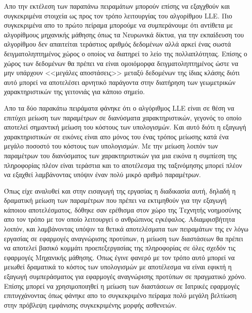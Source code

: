 \par
Απο την εκτέλεση των παραπάνω πειραμάτων μπορούν επίσης να εξαγχθούν και συγκεκριμένα στοιχεία ως προς τον τρόπο λειτουργίας του αλγορίθμου \textlatin{LLE}. Πιο συγκεκριμένα απο το πρώτο πείραμα μπορούμε να συμπεράνουμε ότι αντίθετα με αλγορίθμους μηχανικής μάθησης όπως τα Νευρωνικά δίκτυα, για την εκπαίδευση του αλγορίθμου δεν απαιτείται τεράστιος αριθμός δεδομένων αλλά αρκεί ένας σωστά δειγματοληπτημένος χώρος ο οποίος να διατηρεί το λείο της πολλαπλότητας. Επίσης ο χώρος των δεδομένων θα πρέπει να είναι ομοιόμορφα δειγματοληπτημένος ώστε να μην υπάρχουν <<μεγάλες αποστάσεις>> μεταξύ δεδομένων της ίδιας κλάσης διότι αυτό μπορεί να αποτελέσει αρνητικό παράγοντα στην διατήρηση των γεωμετρικών χαρακτηριστικών της γειτονιάς για κάποιο σημείο.
\par
Απο τα δύο παρακάτω πειράματα φάνηκε ότι ο αλγόριθμος \textlatin{LLE} είναι σε θέση να επιτύχει μείωση των παραμέτρων σε διανύσματα χαρακτηριστικών, γεγονός το οποίο αποτελεί σημαντική μείωση του κόστους των υπολογισμών. Και αυτό διότι η εξαγωγή χαρακτηριστικών σε εικόνες είναι απο μόνος του ένας τρόπος μείωσης κατά ένα μεγάλο ποσοστό του κόστους των υπολογισμών. Με την μείωση λοιπόν των παραμέτρων του διανύσματος των χαρακτηριστικών για μια εικόνα η συμπίεση της πληροφορίας πλέον είναι τεράστια και το αποτέλεσμα της ταξινόμησης μπορεί πλέον να εξαχθεί λαμβάνοντας υπόψιν έναν πολύ μικρό αριθμό παραμέτρων. 
\par
Όπως είχε αναλυθεί και στην εισαγωγή της εργασίας η διαδικασία αυτή, δηλαδή η δραματική μείωση των παραμέτρων που πρέπει να εκτιμηθούν για την εξαγωγή κάποιου αποτελέσματος, δόθηκε σαν ερέθισμα στον χώρο της Τεχνητής νοημοσύνης απο τον τρόπο με τον οποίο λειτουργεί ο ανθρώπινος εγκέφαλος. Αδιαμφισβήτητα λοιπόν, και λαμβάνοντας υπόψιν τα θετικά αποτελέσματα των πειραμάτων της εν λόγω εργασίας σε εφαρμογές αναγνώρισης προτύπων, η μείωση των διαστάσεων θα πρέπει να αποτελεί βασικό κομμάτι προεπεξεργασίας της πληροφορίας σε όλες σχεδόν τις εφαρμογές Μηχανικής μάθησης. Όπως έγινε φανερό με τον τρόπο αυτό μπορεί να μειωθεί δραματικά το κόστος των υπολογισμών με αποτέλεσμα να είναι εφικτή η εξαγωγή συμπεράσματος για εφαρμογές αναγνώρισης προτύπων σε πραγματικό χρόνο. Επίσης μπορεί να χρησιμοποιηθεί η μείωση των διαστάσεων σε Ιατρικές εφαρμογές επιτυγχάνοντας όπως φάνηκε απο το συγκεκριμένο πείραμα πολύ μεγάλη βελτίωση στην πρόβλεψη εμφάνισης συγκεκριμένης μορφής ασθενειών.
\par
